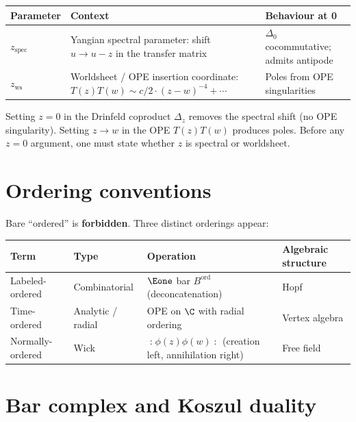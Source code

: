 \begin{center}
\begin{tabular}{@{}lp{5cm}l@{}}
\toprule
\textbf{Parameter} & \textbf{Context} & \textbf{Behaviour at 0} \\
\midrule
$z_{\mathrm{spec}}$ & Yangian spectral parameter: shift
 $u \to u - z$ in the transfer matrix &
 $\Delta_0$ cocommutative; admits antipode \\[4pt]
$z_{\mathrm{ws}}$ & Worldsheet / OPE insertion coordinate:
 $T(z)T(w) \sim c/2 \cdot (z - w)^{-4} + \cdots$ &
 Poles from OPE singularities \\
\bottomrule
\end{tabular}
\end{center}

\noindent
Setting $z = 0$ in the Drinfeld coproduct $\Delta_z$ removes the
spectral shift (no OPE singularity). Setting $z \to w$ in the OPE
$T(z)T(w)$ produces poles. Before any $z = 0$ argument, one must
state whether $z$ is spectral or worldsheet.

\section{Ordering conventions}
\label{sec:nc-ordering}

Bare ``ordered'' is \textbf{forbidden}. Three distinct
orderings appear:

\begin{center}
\begin{tabular}{@{}llll@{}}
\toprule
\textbf{Term} & \textbf{Type} & \textbf{Operation}
 & \textbf{Algebraic structure} \\
\midrule
Labeled-ordered & Combinatorial & $\Eone$ bar
 $B^{\mathrm{ord}}$ (deconcatenation) & Hopf \\
Time-ordered & Analytic / radial & OPE on $\C$ with
 radial ordering & Vertex algebra \\
Normally-ordered & Wick & $\mathopen{:}\phi(z)\phi(w)\mathclose{:}$
 (creation left, annihilation right) & Free field \\
\bottomrule
\end{tabular}
\end{center}

\section{Bar complex and Koszul duality}
\label{sec:nc-bar}

